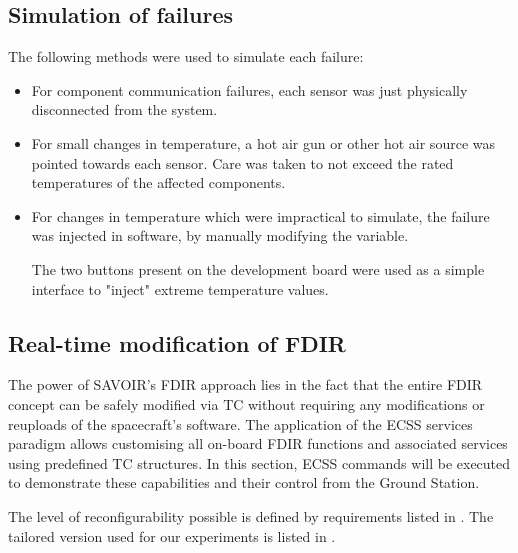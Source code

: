 \documentclass[a4paper,nobib]{tufte-book}
\begin{document}
\subsection{Simulation of failures}

The following methods were used to simulate each failure:
\begin{itemize}
	\item For component communication failures, each sensor was just physically disconnected from the system.
	\item For small changes in temperature, a hot air gun or other hot air source was pointed towards each sensor. Care was taken to not exceed the rated temperatures of the affected components.
	\item For changes in temperature which were impractical to simulate, the failure was injected in software, by manually modifying the variable.
	
	The two buttons present on the development board were used as a simple interface to "inject" extreme temperature values.
\end{itemize}

\subsection{Real-time modification of \ac{FDIR}}

The power of \acs{SAVOIR}'s \ac{FDIR} approach lies in the fact that the entire \ac{FDIR} concept can be safely modified via \ac{TC} without requiring any modifications or reuploads of the spacecraft's software. The application of the \acs{ECSS} services paradigm allows customising all on-board \ac{FDIR} functions and associated services using predefined \ac{TC} structures. In this section, \acs{ECSS} commands will be executed to demonstrate these capabilities and their control from the Ground Station.

The level of reconfigurability possible is defined by requirements listed in \parencite{ECSS-E-ST-70-11C,SAVOIR-HB-003}. The tailored version used for our experiments is listed in .
\end{document}
